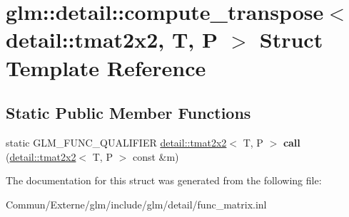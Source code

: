 \hypertarget{structglm_1_1detail_1_1compute__transpose_3_01detail_1_1tmat2x2_00_01_t_00_01_p_01_4}{}\section{glm\+:\+:detail\+:\+:compute\+\_\+transpose$<$ detail\+:\+:tmat2x2, T, P $>$ Struct Template Reference}
\label{structglm_1_1detail_1_1compute__transpose_3_01detail_1_1tmat2x2_00_01_t_00_01_p_01_4}
\subsection*{Static Public Member Functions}
\begin{DoxyCompactItemize}
\item 
static G\+L\+M\+\_\+\+F\+U\+N\+C\+\_\+\+Q\+U\+A\+L\+I\+F\+I\+ER \hyperlink{structglm_1_1detail_1_1tmat2x2}{detail\+::tmat2x2}$<$ T, P $>$ {\bfseries call} (\hyperlink{structglm_1_1detail_1_1tmat2x2}{detail\+::tmat2x2}$<$ T, P $>$ const \&m)\hypertarget{structglm_1_1detail_1_1compute__transpose_3_01detail_1_1tmat2x2_00_01_t_00_01_p_01_4_a213c7106f07140855ec81d916ae5f629}{}\label{structglm_1_1detail_1_1compute__transpose_3_01detail_1_1tmat2x2_00_01_t_00_01_p_01_4_a213c7106f07140855ec81d916ae5f629}

\end{DoxyCompactItemize}


The documentation for this struct was generated from the following file\+:\begin{DoxyCompactItemize}
\item 
Commun/\+Externe/glm/include/glm/detail/func\+\_\+matrix.\+inl\end{DoxyCompactItemize}
